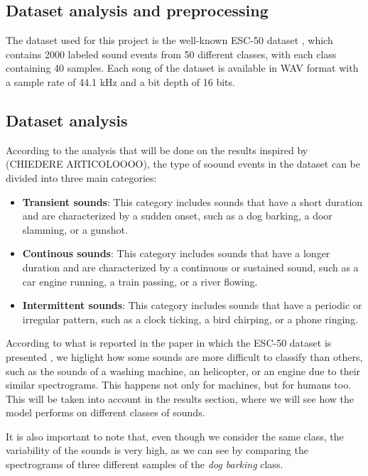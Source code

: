 \documentclass{article}
\begin{document}
\begin{sloppy}
\section{Dataset analysis and preprocessing}
\label{sec:format}

The dataset used for this project is the well-known ESC-50 dataset \cite{piczak2015dataset}, which contains
2000 labeled sound events from 50 different classes, with each class containing 40 samples. Each song of the dataset is available in WAV format with
a sample rate of 44.1 kHz and a bit depth of 16 bits.

\subsection{Dataset analysis}
According to the analysis that will be done on the results inspired by (CHIEDERE ARTICOLOOOO), the type of soound events in the dataset can be divided into three main categories:
\begin{itemize}
    \item \textbf{Transient sounds}: This category includes sounds that have a short duration and are characterized by a sudden onset, such as a dog barking, a door slamming, or a gunshot.
    \item \textbf{Continous sounds}: This category includes sounds that have a longer duration and are characterized by a continuous or sustained sound, such as a car engine running, a train passing, or a river flowing.
    \item \textbf{Intermittent sounds}: This category includes sounds that have a periodic or irregular pattern, such as a clock ticking, a bird chirping, or a phone ringing.
\end{itemize}

According to what is reported in the paper in which the ESC-50 dataset is presented \cite{piczak2015dataset}, we higlight how some sounds are more difficult to classify than others,
such as the sounds of a washing machine, an helicopter, or an engine due to their similar spectrograms.
This happens not only for machines, but for humans too. This will be taken into account in the results section, where we will see how the model performs on different classes of sounds.

It is also important to note that, even though we consider the same class, the variability of the sounds is very high, as we can see by comparing the spectrograms of three different
samples of the \textit{dog barking} class.


\end{sloppy}
\end{document}
